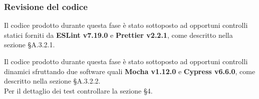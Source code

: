 \subsubsection{Revisione del codice}

Il codice prodotto durante questa fase è stato sottoposto ad opportuni controlli statici forniti da \textbf{ESLint v7.19.0} e \textbf{Prettier v2.2.1}, come descritto nella sezione \S{A.3.2.1}.

Il codice prodotto durante questa fase è stato sottoposto ad opportuni controlli dinamici sfruttando due software quali \textbf{Mocha v1.12.0} e \textbf{Cypress v6.6.0}, come descritto nella sezione \S{A.3.2.2}.\\
Per il dettaglio dei test controllare la sezione \S{4}.